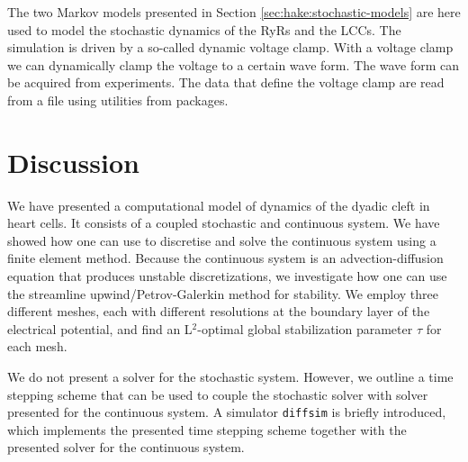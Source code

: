 The two Markov models presented in Section
\ref{sec:hake:stochastic-models} are here used to model the stochastic
dynamics of the RyRs and the LCCs. The simulation is driven by a
so-called dynamic voltage clamp. With a voltage clamp we can
dynamically clamp the voltage to a certain wave form. The wave form
can be acquired from experiments. The data that define the voltage
clamp are read from a file using utilities from \numpy
{} packages.\par

\section{Discussion}
We have presented a computational model of \Ca dynamics of the dyadic
cleft in heart cells. It consists of a coupled stochastic and
continuous system. We have showed how one can use \pydolfin to
discretise and solve the continuous system using a finite element
method. Because the continuous system is an advection-diffusion
equation that produces unstable discretizations, we investigate how
one can use the streamline upwind/Petrov-Galerkin method for
stability. We employ three different meshes, each with different
resolutions at the boundary layer of the electrical potential, and
find an L$^2$-optimal global stabilization parameter $\tau$ for each
mesh.\par

We do not present a solver for the stochastic system. However, we
outline a time stepping scheme that can be used to couple the
stochastic solver with solver presented for the continuous system. A
simulator \texttt{diffsim} is briefly introduced, which implements the
presented time stepping scheme together with the presented solver for
the continuous system.

